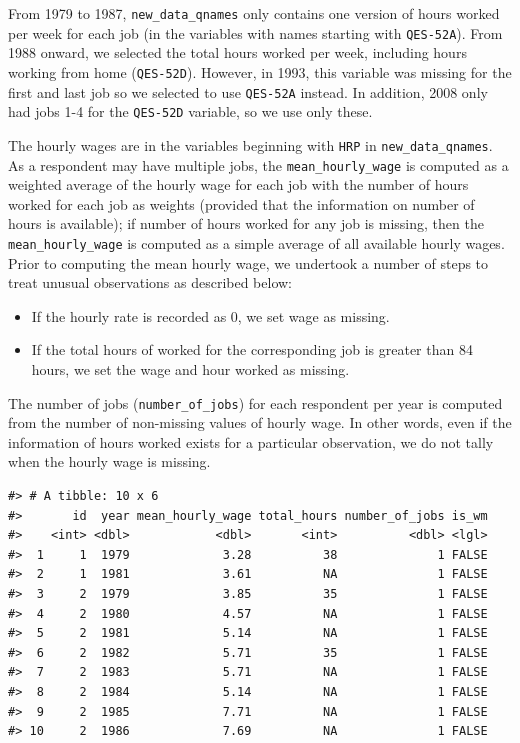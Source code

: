 \documentclass{article}
\providecommand{\tightlist}{%
  \setlength{\itemsep}{0pt}\setlength{\parskip}{0pt}}
\begin{document}
From 1979 to 1987, \texttt{new\_data\_qnames} only contains one version of hours worked per week for each job (in the variables with names starting with \texttt{QES-52A}). From 1988 onward, we selected the total hours worked per week, including hours working from home (\texttt{QES-52D}). However, in 1993, this variable was missing for the first and last job so we selected to use \texttt{QES-52A} instead. In addition, 2008 only had jobs 1-4 for the \texttt{QES-52D} variable, so we use only these.

The hourly wages are in the variables beginning with \texttt{HRP} in \texttt{new\_data\_qnames}. As a respondent may have multiple jobs, the \texttt{mean\_hourly\_wage} is computed as a weighted average of the hourly wage for each job with the number of hours worked for each job as weights (provided that the information on number of hours is available); if number of hours worked for any job is missing, then the \texttt{mean\_hourly\_wage} is computed as a simple average of all available hourly wages. Prior to computing the mean hourly wage, we undertook a number of steps to treat unusual observations as described below:

\begin{itemize}
\tightlist
\item
  If the hourly rate is recorded as 0, we set wage as missing.
\item
  If the total hours of worked for the corresponding job is greater than 84 hours, we set the wage and hour worked as missing.
\end{itemize}

The number of jobs (\texttt{number\_of\_jobs}) for each respondent per year is computed from the number of non-missing values of hourly wage. In other words, even if the information of hours worked exists for a particular observation, we do not tally when the hourly wage is missing.

\begin{verbatim}
#> # A tibble: 10 x 6
#>       id  year mean_hourly_wage total_hours number_of_jobs is_wm
#>    <int> <dbl>            <dbl>       <int>          <dbl> <lgl>
#>  1     1  1979             3.28          38              1 FALSE
#>  2     1  1981             3.61          NA              1 FALSE
#>  3     2  1979             3.85          35              1 FALSE
#>  4     2  1980             4.57          NA              1 FALSE
#>  5     2  1981             5.14          NA              1 FALSE
#>  6     2  1982             5.71          35              1 FALSE
#>  7     2  1983             5.71          NA              1 FALSE
#>  8     2  1984             5.14          NA              1 FALSE
#>  9     2  1985             7.71          NA              1 FALSE
#> 10     2  1986             7.69          NA              1 FALSE
\end{verbatim}
\end{document}
